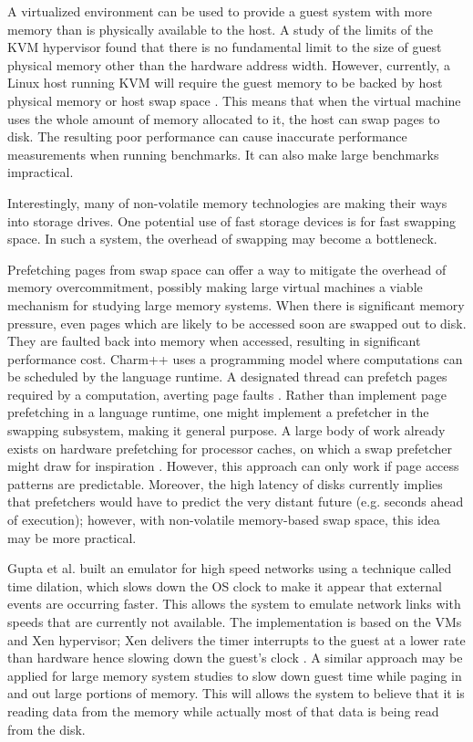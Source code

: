 \documentclass[twocolumn,11pt]{article}
\begin{document}
A virtualized environment can be used to provide a guest system with more memory
than is physically available to the host. A study of the limits of the KVM
hypervisor found that there is no fundamental limit to the size of guest
physical memory other than the hardware address width. However, currently, a
Linux host running KVM will require the guest memory to be backed by host
physical memory or host swap space \cite{ibmkvm}.  This means that when the
virtual machine uses the whole amount of memory allocated to it, the host can
swap pages to disk. The resulting poor performance can cause inaccurate
performance measurements when running benchmarks. It can also make large
benchmarks impractical.

Interestingly, many of non-volatile memory technologies are making their ways
into storage drives. One potential use of fast storage devices is for fast
swapping space. In such a system, the overhead of swapping may become a
bottleneck.

Prefetching pages from swap space can offer a way to mitigate the overhead of
memory overcommitment, possibly making large virtual machines a viable
mechanism for studying large memory systems. When there is significant memory
pressure, even pages which are likely to be accessed soon are swapped out to
disk. They are faulted back into memory when accessed, resulting in significant
performance cost.  Charm++ uses a programming model where computations can be
scheduled by the language runtime. A designated thread can prefetch pages
required by a computation, averting page faults \cite{charmpp}. Rather than
implement page prefetching in a language runtime, one might implement a
prefetcher in the swapping subsystem, making it general purpose. A large body
of work already exists on hardware prefetching for processor caches, on which a
swap prefetcher might draw for inspiration \cite{prefetching}. However, this
approach can only work if page access patterns are predictable. Moreover, the
high latency of disks currently implies that prefetchers would have to predict
the very distant future (e.g. seconds ahead of execution); however, with
non-volatile memory-based swap space, this idea may be more practical.

Gupta et al. built an emulator for high speed networks using a technique called
time dilation, which slows down the OS clock to make it appear that external
events are occurring faster. This allows the system to emulate network links
with speeds that are currently not available. The implementation is based on
the VMs and Xen hypervisor; Xen delivers the timer interrupts to the guest at a
lower rate than hardware hence  slowing down the guest’s clock \cite{timedil}.
A similar approach may be applied for large memory system studies to slow down
guest time while paging in and out large portions of memory. This will allows
the system to believe that it is reading data from the memory while actually
most of that data is being read from the disk.
\end{document}
